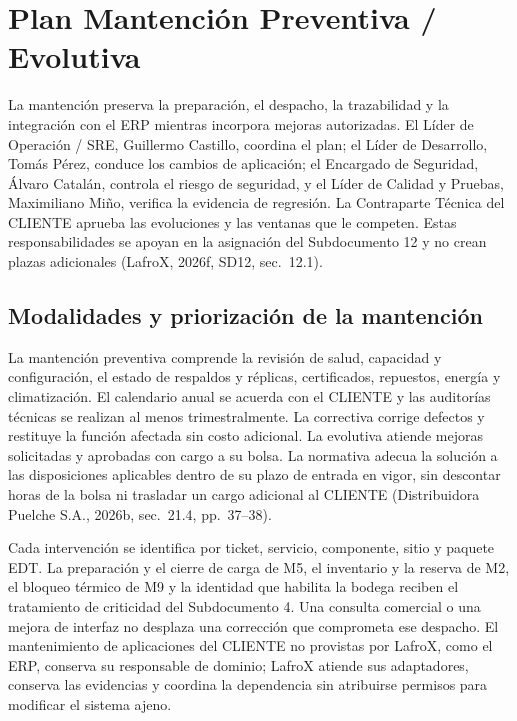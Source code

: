 \section{Plan Mantención Preventiva / Evolutiva}
\label{sec:sd11-mantencion}

La mantención preserva la preparación, el despacho, la trazabilidad y la integración con el ERP mientras incorpora mejoras autorizadas. El Líder de Operación / SRE, Guillermo Castillo, coordina el plan; el Líder de Desarrollo, Tomás Pérez, conduce los cambios de aplicación; el Encargado de Seguridad, Álvaro Catalán, controla el riesgo de seguridad, y el Líder de Calidad y Pruebas, Maximiliano Miño, verifica la evidencia de regresión. La Contraparte Técnica del CLIENTE aprueba las evoluciones y las ventanas que le competen. Estas responsabilidades se apoyan en la asignación del Subdocumento 12 y no crean plazas adicionales (LafroX, 2026f, SD12, sec.~12.1).

\subsection{Modalidades y priorización de la mantención}
\label{subsec:sd11-modalidades}

La mantención preventiva comprende la revisión de salud, capacidad y configuración, el estado de respaldos y réplicas, certificados, repuestos, energía y climatización. El calendario anual se acuerda con el CLIENTE y las auditorías técnicas se realizan al menos trimestralmente. La correctiva corrige defectos y restituye la función afectada sin costo adicional. La evolutiva atiende mejoras solicitadas y aprobadas con cargo a su bolsa. La normativa adecua la solución a las disposiciones aplicables dentro de su plazo de entrada en vigor, sin descontar horas de la bolsa ni trasladar un cargo adicional al CLIENTE (Distribuidora Puelche S.A., 2026b, sec.~21.4, pp.~37--38).

Cada intervención se identifica por ticket, servicio, componente, sitio y paquete EDT. La preparación y el cierre de carga de M5, el inventario y la reserva de M2, el bloqueo térmico de M9 y la identidad que habilita la bodega reciben el tratamiento de criticidad del Subdocumento 4. Una consulta comercial o una mejora de interfaz no desplaza una corrección que comprometa ese despacho. El mantenimiento de aplicaciones del CLIENTE no provistas por LafroX, como el ERP, conserva su responsable de dominio; LafroX atiende sus adaptadores, conserva las evidencias y coordina la dependencia sin atribuirse permisos para modificar el sistema ajeno.

